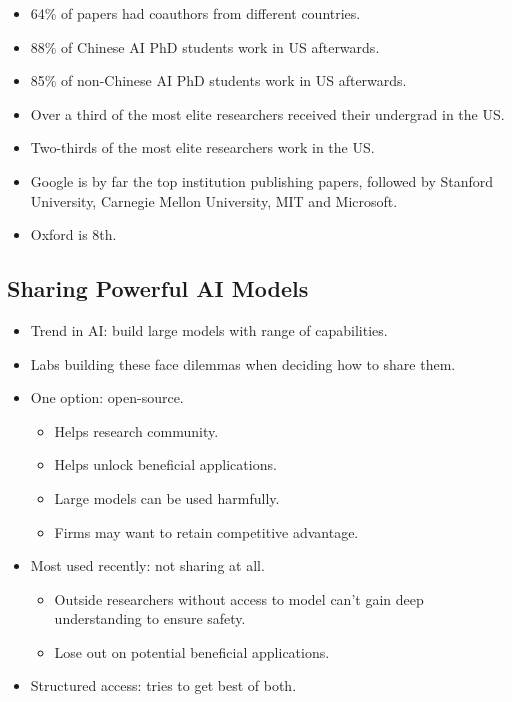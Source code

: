 \begin{itemize}
    \begin{itemize}
        \item 64\% of papers had coauthors from different countries.
        \item 88\% of Chinese AI PhD students work in US afterwards.
        \item 85\% of non-Chinese AI PhD students work in US afterwards.
        \item Over a third of the most elite researchers received their undergrad in the US.
        \item Two-thirds of the most elite researchers work in the US.
        \item Google is by far the top institution publishing papers, followed by Stanford University, Carnegie Mellon University, MIT and Microsoft.
        \item Oxford is 8th.
    \end{itemize}
\end{itemize}


\subsection{Sharing Powerful AI Models}

\begin{itemize}
    \item Trend in AI: build large models with range of capabilities.
    \item Labs building these face dilemmas when deciding how to share them.
    \item One option: open-source.
    \begin{itemize}
        \item Helps research community.
        \item Helps unlock beneficial applications.
        \item Large models can be used harmfully.
        \item Firms may want to retain competitive advantage.
    \end{itemize}
    \item Most used recently: not sharing at all.
    \begin{itemize}
        \item Outside researchers without access to model can't gain deep understanding to ensure safety.
        \item Lose out on potential beneficial applications.
    \end{itemize}
    \item Structured access: tries to get best of both.
\end{itemize}



